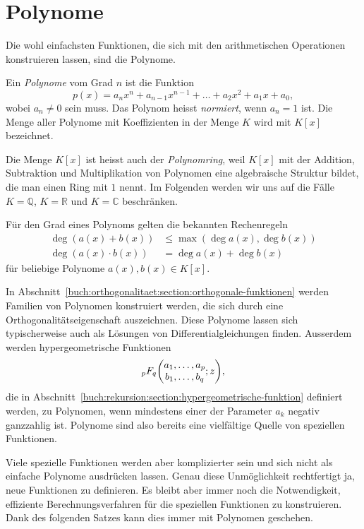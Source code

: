 %
%
%
\section{Polynome
\label{buch:potenzen:section:polynome}}
Die wohl einfachsten Funktionen, die sich mit den arithmetischen
Operationen konstruieren lassen, sind die Polynome.

\begin{definition}
%
Ein {\em Polynome} vom Grad $n$ ist die Funktion
\[
p(x) = a_nx^n + a_{n-1}x^{n-1} + \dots + a_2x^2 + a_1x + a_0,
\]
wobei $a_n\ne 0$ sein muss.
Das Polynom heisst {\em normiert}, wenn $a_n=1$ ist.
%
%
Die Menge aller Polynome mit Koeffizienten in der Menge $K$ wird mit
$K[x]$ bezeichnet.
\end{definition}

Die Menge $K[x]$ ist heisst auch der {\em Polynomring}, weil $K[x]$
mit der Addition, Subtraktion und Multiplikation von Polynomen eine
algebraische Struktur bildet, die man einen Ring mit $1$ nennt.
%
Im Folgenden werden wir uns auf die Fälle $K=\mathbb{Q}$, $K=\mathbb{R}$
und $K=\mathbb{C}$ beschränken.

Für den Grad eines Polynoms gelten die bekannten Rechenregeln
\begin{align*}
\deg (a(x) + b(x)) &\le \operatorname{max}(\deg a(x), \deg b(x))
\\
\deg (a(x)\cdot b(x)) &=\deg a(x) + \deg b(x)
\end{align*}
für beliebige Polynome $a(x),b(x)\in K[x]$.

In Abschnitt~\ref{buch:orthogonalitaet:section:orthogonale-funktionen} werden
Familien von Polynomen konstruiert werden, die sich durch eine
Orthogonalitätseigenschaft auszeichnen.
Diese Polynome lassen sich typischerweise auch als Lösungen von
Differentialgleichungen finden.
Ausserdem werden hypergeometrische Funktionen
\[
\mathstrut_pF_q\biggl(
\begin{matrix}a_1,\dots,a_p\\b_1,\dots,b_q\end{matrix};z
\biggr),
\] die in
Abschnitt~\ref{buch:rekursion:section:hypergeometrische-funktion}
definiert werden, zu Polynomen, wenn mindestens einer der
Parameter $a_k$ negativ ganzzahlig ist.
Polynome sind also bereits eine vielfältige Quelle von speziellen
Funktionen.

Viele spezielle Funktionen werden aber komplizierter sein und
sich nicht als einfache Polynome ausdrücken lassen.
Genau diese Unmöglichkeit rechtfertigt ja, neue Funktionen
zu definieren.
Es bleibt aber immer noch die Notwendigkeit, effiziente 
Berechnungsverfahren für die speziellen Funktionen zu konstruieren.
Dank des folgenden Satzes kann dies immer mit Polynomen geschehen.


